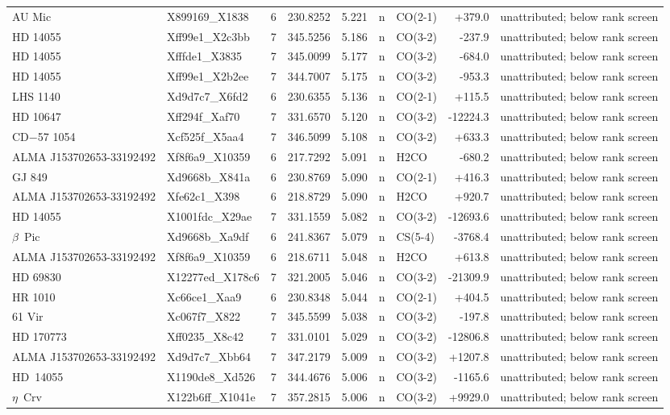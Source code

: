 \begin{tabular}{@{}l@{~}l@{~}c@{~}r@{~}r@{~}c@{~}l@{~}r@{~}l@{}}
AU Mic & X899169\_X1838 & 6 & 230.8252 & 5.221 & n & CO(2-1) & +379.0 & unattributed; below rank screen \\
HD 14055 & Xff99e1\_X2c3bb & 7 & 345.5256 & 5.186 & n & CO(3-2) & -237.9 & unattributed; below rank screen \\
HD 14055 & Xfffde1\_X3835 & 7 & 345.0099 & 5.177 & n & CO(3-2) & -684.0 & unattributed; below rank screen \\
HD 14055 & Xff99e1\_X2b2ee & 7 & 344.7007 & 5.175 & n & CO(3-2) & -953.3 & unattributed; below rank screen \\
LHS 1140 & Xd9d7c7\_X6fd2 & 6 & 230.6355 & 5.136 & n & CO(2-1) & +115.5 & unattributed; below rank screen \\
HD 10647 & Xff294f\_Xaf70 & 7 & 331.6570 & 5.120 & n & CO(3-2) & -12224.3 & unattributed; below rank screen \\
CD$-$57 1054 & Xcf525f\_X5aa4 & 7 & 346.5099 & 5.108 & n & CO(3-2) & +633.3 & unattributed; below rank screen \\
ALMA J153702653-33192492 & Xf8f6a9\_X10359 & 6 & 217.7292 & 5.091 & n & H2CO & -680.2 & unattributed; below rank screen \\
GJ 849 & Xd9668b\_X841a & 6 & 230.8769 & 5.090 & n & CO(2-1) & +416.3 & unattributed; below rank screen \\
ALMA J153702653-33192492 & Xfe62c1\_X398 & 6 & 218.8729 & 5.090 & n & H2CO & +920.7 & unattributed; below rank screen \\
HD 14055 & X1001fdc\_X29ae & 7 & 331.1559 & 5.082 & n & CO(3-2) & -12693.6 & unattributed; below rank screen \\
$\beta$~Pic & Xd9668b\_Xa9df & 6 & 241.8367 & 5.079 & n & CS(5-4) & -3768.4 & unattributed; below rank screen \\
ALMA J153702653-33192492 & Xf8f6a9\_X10359 & 6 & 218.6711 & 5.048 & n & H2CO & +613.8 & unattributed; below rank screen \\
HD 69830 & X12277ed\_X178c6 & 7 & 321.2005 & 5.046 & n & CO(3-2) & -21309.9 & unattributed; below rank screen \\
HR 1010 & Xc66ce1\_Xaa9 & 6 & 230.8348 & 5.044 & n & CO(2-1) & +404.5 & unattributed; below rank screen \\
61 Vir & Xc067f7\_X822 & 7 & 345.5599 & 5.038 & n & CO(3-2) & -197.8 & unattributed; below rank screen \\
HD 170773 & Xff0235\_X8c42 & 7 & 331.0101 & 5.029 & n & CO(3-2) & -12806.8 & unattributed; below rank screen \\
ALMA J153702653-33192492 & Xd9d7c7\_Xbb64 & 7 & 347.2179 & 5.009 & n & CO(3-2) & +1207.8 & unattributed; below rank screen \\
HD~14055 & X1190de8\_Xd526 & 7 & 344.4676 & 5.006 & n & CO(3-2) & -1165.6 & unattributed; below rank screen \\
$\eta$~Crv & X122b6ff\_X1041e & 7 & 357.2815 & 5.006 & n & CO(3-2) & +9929.0 & unattributed; below rank screen \\
\hline
\end{tabular}
